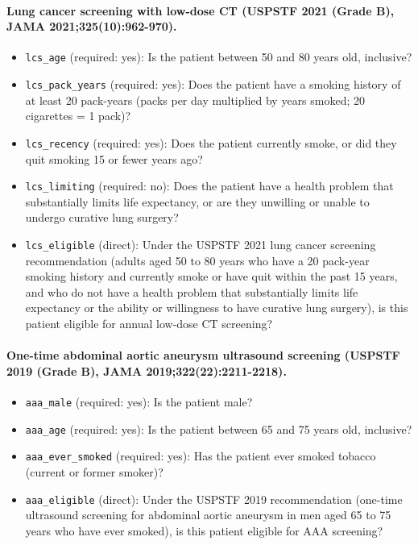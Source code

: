 \begin{small}
\paragraph{Lung cancer screening with low-dose CT (USPSTF 2021 (Grade B), JAMA 2021;325(10):962-970).}\begin{itemize}
\item \texttt{lcs\_age} (required: yes): Is the patient between 50 and 80 years old, inclusive?
\item \texttt{lcs\_pack\_years} (required: yes): Does the patient have a smoking history of at least 20 pack-years (packs per day multiplied by years smoked; 20 cigarettes = 1 pack)?
\item \texttt{lcs\_recency} (required: yes): Does the patient currently smoke, or did they quit smoking 15 or fewer years ago?
\item \texttt{lcs\_limiting} (required: no): Does the patient have a health problem that substantially limits life expectancy, or are they unwilling or unable to undergo curative lung surgery?
\item \texttt{lcs\_eligible} (direct): Under the USPSTF 2021 lung cancer screening recommendation (adults aged 50 to 80 years who have a 20 pack-year smoking history and currently smoke or have quit within the past 15 years, and who do not have a health problem that substantially limits life expectancy or the ability or willingness to have curative lung surgery), is this patient eligible for annual low-dose CT screening?\end{itemize}
\paragraph{One-time abdominal aortic aneurysm ultrasound screening (USPSTF 2019 (Grade B), JAMA 2019;322(22):2211-2218).}\begin{itemize}
\item \texttt{aaa\_male} (required: yes): Is the patient male?
\item \texttt{aaa\_age} (required: yes): Is the patient between 65 and 75 years old, inclusive?
\item \texttt{aaa\_ever\_smoked} (required: yes): Has the patient ever smoked tobacco (current or former smoker)?
\item \texttt{aaa\_eligible} (direct): Under the USPSTF 2019 recommendation (one-time ultrasound screening for abdominal aortic aneurysm in men aged 65 to 75 years who have ever smoked), is this patient eligible for AAA screening?\end{itemize}

\end{small}
